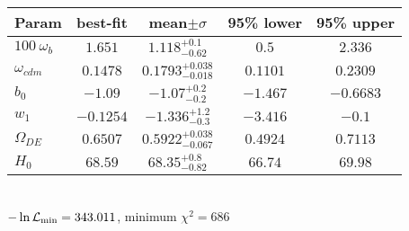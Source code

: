 \begin{tabular}{|l|c|c|c|c|} 
 \hline 
Param & best-fit & mean$\pm\sigma$ & 95\% lower & 95\% upper \\ \hline 
$100~\omega_{b }$ &$1.651$ & $1.118_{-0.62}^{+0.1}$ & $0.5$ & $2.336$ \\ 
$\omega_{cdm }$ &$0.1478$ & $0.1793_{-0.018}^{+0.038}$ & $0.1101$ & $0.2309$ \\ 
$b_{0 }$ &$-1.09$ & $-1.07_{-0.2}^{+0.2}$ & $-1.467$ & $-0.6683$ \\ 
$w_{1 }$ &$-0.1254$ & $-1.336_{-0.3}^{+1.2}$ & $-3.416$ & $-0.1$ \\ 
$\Omega_{DE}$ &$0.6507$ & $0.5922_{-0.067}^{+0.038}$ & $0.4924$ & $0.7113$ \\ 
$H_{0 }$ &$68.59$ & $68.35_{-0.82}^{+0.8}$ & $66.74$ & $69.98$ \\ 
\hline 
 \end{tabular} \\ 
$-\ln{\cal L}_\mathrm{min} =343.011$, minimum $\chi^2=686$ \\ 

